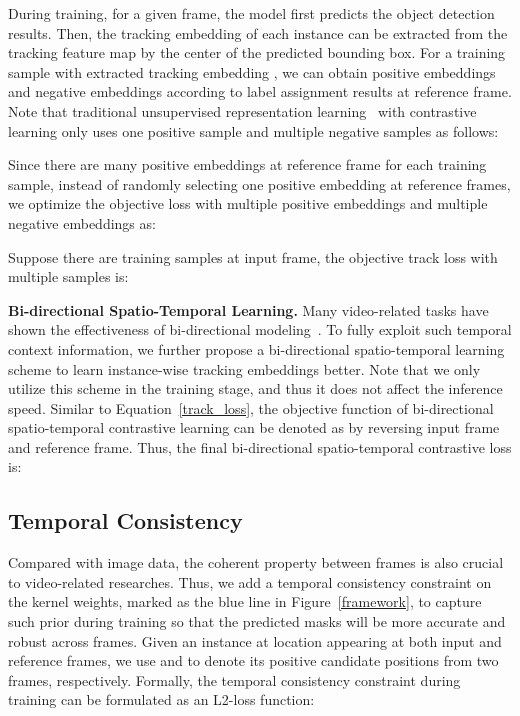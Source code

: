 \documentclass[runningheads]{llncs}
\begin{document}
During training, for a given frame, the model first predicts the object detection results. Then, the tracking embedding of each instance can be extracted from the tracking feature map by the center of the predicted bounding box. For a training sample with extracted tracking embedding , we can obtain positive embeddings  and negative embeddings  according to label assignment results at reference frame. Note that traditional  unsupervised representation learning~\cite{he2020momentum,chen2020simple} with contrastive learning only uses one positive sample and multiple negative samples as follows: 



Since there are many positive embeddings at reference frame for each training sample, instead of randomly selecting one positive embedding at reference frames, we optimize the objective loss with multiple positive embeddings and multiple negative embeddings as:

Suppose there are  training samples at input frame, the objective track loss with multiple samples is:



\noindent \textbf{Bi-directional Spatio-Temporal Learning.} Many video-related tasks have shown the effectiveness of bi-directional modeling~\cite{zhu2017bidirectional,sun2019learning}. To fully exploit such temporal context information, we further propose a bi-directional spatio-temporal learning scheme to learn instance-wise tracking embeddings better. Note that we only utilize this scheme in the training stage, and thus it does not affect the inference speed. Similar to Equation~\ref{track_loss}, the objective function of bi-directional spatio-temporal contrastive learning can be denoted as  by reversing input frame and reference frame. Thus, the final bi-directional spatio-temporal contrastive loss is:




\subsection{Temporal Consistency}
Compared with image data, the coherent property between frames is also crucial to video-related researches. Thus, we add a temporal consistency constraint on the kernel weights, marked as the blue line in Figure~\ref{framework}, to capture such prior during training so that the predicted masks will be more accurate and robust across frames. Given an instance at location  appearing at both input and reference frames, we use  and  to denote its positive candidate positions from two frames, respectively. 
Formally, the temporal consistency constraint during training can be formulated as an L2-loss function:
\end{document}
